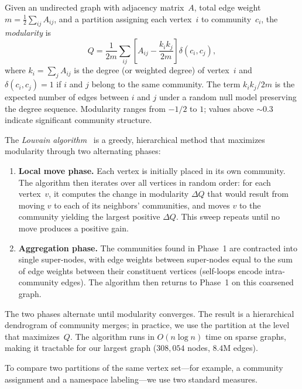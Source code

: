 \begin{definition}
\label{def:modularity}
Given an undirected graph with adjacency matrix~$A$, total edge weight $m = \frac{1}{2}\sum_{ij} A_{ij}$, and a partition assigning each vertex~$i$ to community~$c_i$, the \emph{modularity} is
\[
  Q = \frac{1}{2m} \sum_{ij} \left[ A_{ij} - \frac{k_i k_j}{2m} \right] \delta(c_i, c_j),
\]
where $k_i = \sum_j A_{ij}$ is the degree (or weighted degree) of vertex~$i$ and $\delta(c_i, c_j) = 1$ if $i$ and $j$ belong to the same community. The term $k_i k_j / 2m$ is the expected number of edges between $i$ and $j$ under a random null model preserving the degree sequence. Modularity ranges from $-1/2$ to $1$; values above ${\sim}0.3$ indicate significant community structure.
\end{definition}

The \emph{Louvain algorithm}~\cite{blondel2008} is a greedy, hierarchical method that maximizes modularity through two alternating phases:

\begin{enumerate}
\item \textbf{Local move phase.} Each vertex is initially placed in its own community. The algorithm then iterates over all vertices in random order: for each vertex~$v$, it computes the change in modularity $\Delta Q$ that would result from moving $v$ to each of its neighbors' communities, and moves $v$ to the community yielding the largest positive $\Delta Q$. This sweep repeats until no move produces a positive gain.

\item \textbf{Aggregation phase.} The communities found in Phase~1 are contracted into single super-nodes, with edge weights between super-nodes equal to the sum of edge weights between their constituent vertices (self-loops encode intra-community edges). The algorithm then returns to Phase~1 on this coarsened graph.
\end{enumerate}

\noindent
The two phases alternate until modularity converges. The result is a hierarchical dendrogram of community merges; in practice, we use the partition at the level that maximizes~$Q$. The algorithm runs in $O(n \log n)$ time on sparse graphs, making it tractable for our largest graph ($308{,}054$ nodes, $8.4$M edges).

To compare two partitions of the same vertex set---for example, a community assignment and a namespace labeling---we use two standard measures.

